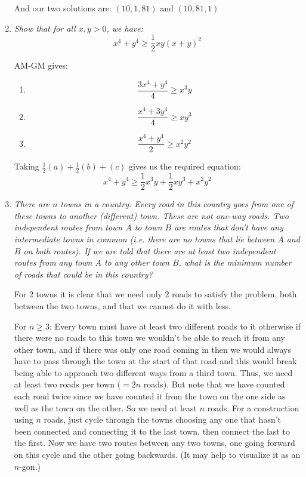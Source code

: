 \documentclass{article}
\begin{document}
\begin{enumerate}[1.]
And our two solutions are: $(10,1,81)$ and $(10,81,1)$


\vspace{24pt}
\item %
{\itshape Show that for all $x,y > 0$, we have:
$$ x^4 + y^4 \geq \frac{1}{2} xy (x+y)^2 $$}

AM-GM gives:
\begin{enumerate}
\item $$\frac{3x^4+y^4}{4}\geq x^3y$$
\item $$\frac{x^4+3y^4}{4}\geq xy^3$$
\item $$\frac{x^4+y^4}{2}\geq x^2y^2$$
\end{enumerate}

Taking $\frac{1}{2}(a)+\frac{1}{2}(b)+(c)$ gives us the required equation:
$$ x^4 + y^4 \geq \frac{1}{2} x^3y + \frac{1}{2} xy^3 + x^2y^2  $$


\vspace{24pt}
\item %
{\itshape There are $n$ towns in a country.
Every road in this country goes from one of these towns to another (different) town. These are not one-way roads.
Two independent routes from town $A$ to town $B$ are routes that don't have any intermediate towns in common (i.e. there are no towns that lie between $A$ and $B$ on both routes).
If we are told that there are at least two independent routes from any town $A$ to any other town $B$, what is the minimum number of roads that could be in this country?}

For 2 towns it is clear that we need only 2 roads to satisfy the problem, both between the two towns, and that we cannot do it with less.

For $n \geq 3$:
Every town must have at least two different roads to it otherwise if there were no roads to this town we wouldn't be able to reach it from any other town, and if there was only one road coming in then we would always have to pass through the town at the start of that road and this would break being able to approach two different ways from a third town. Thus, we need at least two roads per town ($=2n$ roads). But note that we have counted each road twice since we have counted it from the town on the one side as well as the town on the other. So we need at least $n$ roads. For a construction using $n$ roads, just cycle through the towns choosing any one that hasn't been connected and connecting it to the last town, then connect the last to the first. Now we have two routes between any two towns, one going forward on this cycle and the other going backwards. (It may help to visualize it as an $n$-gon.)





\end{enumerate}
\end{document}
